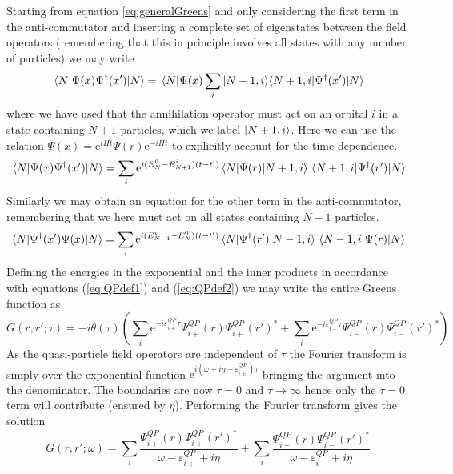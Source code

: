 \begin{solution}
Starting from equation \ref{eq:generalGreens} and only considering the first term in the anti-commutator and inserting a complete set of eigenstates between the field operators (remembering that this in principle involves all states with any number of particles) we may write
\begin{equation}
    \mel{N}{\Psi(x)\Psi^{\dagger}(x')}{N} = \mel{N}{\Psi(x)\sum_i|N+1,i\rangle\langle N+1,i |\Psi^{\dagger}(x')}{N}
\end{equation}
where we have used that the annihilation operator must act on an orbital $i$ in a state containing $N+1$ particles, which we label $|N+1,i\rangle$. Here we can use the relation $\Psi(x) = \mathrm{e}^{iHt}\Psi(r)\mathrm{e}^{-iHt}$ to explicitly account for the time dependence.
\begin{equation}
    \mel{N}{\Psi(x)\Psi^{\dagger}(x')}{N} = \sum_i\mathrm{e}^{i(E^{0}_{N} - E^{i}_{N+1})(t-t')}\mel{N}{\Psi(r)}{N+1,i}\mel{N+1,i}{\Psi^{\dagger}(r')}{N}
\end{equation}
Similarly we may obtain an equation for the other term in the anti-commutator, remembering that we here must act on all states containing $N-1$ particles.
\begin{equation}
    \mel{N}{\Psi^{\dagger}(x')\Psi(x)}{N} = \sum_i\mathrm{e}^{i(E^{i}_{N-1} - E^{0}_{N})(t-t')}\mel{N}{\Psi^{\dagger}(r')}{N-1,i}\mel{N-1,i}{\Psi(r)}{N}
\end{equation}
Defining the energies in the exponential and the inner products in accordance with equations (\ref{eq:QPdef1}) and (\ref{eq:QPdef2}) we may write the entire Greens function as
\begin{equation}
    G(r,r';\tau) = -i\theta(\tau)\left(\sum_i \mathrm{e}^{-i\varepsilon_{i+}^{QP}\tau}\Psi_{i+}^{QP}(r)\Psi_{i+}^{QP}(r')^{*} + \sum_i \mathrm{e}^{-i\varepsilon_{i-}^{QP}\tau}\Psi_{i-}^{QP}(r)\Psi_{i-}^{QP}(r')^{*}\right)
\end{equation}
As the quasi-particle field operators are independent of $\tau$ the Fourier transform is simply over the exponential function $\mathrm{e}^{i(\omega + i\eta - \varepsilon_{i\pm}^{QP})\tau}$ bringing the argument into the denominator. The boundaries are now $\tau = 0$ and $\tau \rightarrow \infty$ hence only the $\tau = 0$ term will contribute (ensured by $\eta$). Performing the Fourier transform gives the solution
\begin{equation}
    G(r,r';\omega) = \sum_i \dfrac{\Psi_{i+}^{QP}(r)\Psi_{i+}^{QP}(r')^{*}}{\omega - \varepsilon_{i+}^{QP} +i\eta} + \sum_i \dfrac{\Psi_{i-}^{QP}(r)\Psi_{i-}^{QP}(r')^{*}}{\omega-\varepsilon_{i-}^{QP} + i\eta}
\end{equation}
\end{solution}


